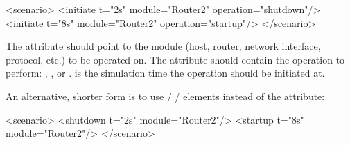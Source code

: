 \begin{XML}
<scenario>
  <initiate t="2s" module="Router2" operation="shutdown"/> 
  <initiate t="8s" module="Router2" operation="startup"/> 
</scenario>
\end{XML}

The  attribute should point to the module (host, router,
network interface, protocol, etc.) to be operated on. 
The  attribute should contain the operation to perform:
, , or .
 is the simulation time the operation should be initiated at.

An alternative, shorter form is to use  / 
 /  elements instead of the
 attribute:

\begin{XML}
<scenario>
  <shutdown t="2s" module="Router2"/> 
  <startup  t="8s" module="Router2"/> 
</scenario>
\end{XML}





